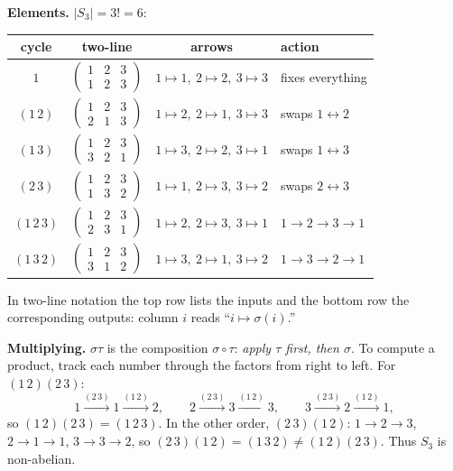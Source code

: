 \documentclass[11pt]{report}
\begin{document}
\begin{exbox}\label{ex:group-s3-detail}
\textbf{Elements.} $|S_3| = 3! = 6$:
\begin{center}
\renewcommand{\arraystretch}{1.15}
\begin{tabular}{c|c|c|l}
cycle & two-line & arrows & action \\ \hline
$1$ & $\begin{pmatrix}1&2&3\\1&2&3\end{pmatrix}$ & $1\mapsto1,\ 2\mapsto2,\ 3\mapsto3$ & fixes everything \\[10pt]
$(1\,2)$ & $\begin{pmatrix}1&2&3\\2&1&3\end{pmatrix}$ & $1\mapsto2,\ 2\mapsto1,\ 3\mapsto3$ & swaps $1 \leftrightarrow 2$ \\[10pt]
$(1\,3)$ & $\begin{pmatrix}1&2&3\\3&2&1\end{pmatrix}$ & $1\mapsto3,\ 2\mapsto2,\ 3\mapsto1$ & swaps $1 \leftrightarrow 3$ \\[10pt]
$(2\,3)$ & $\begin{pmatrix}1&2&3\\1&3&2\end{pmatrix}$ & $1\mapsto1,\ 2\mapsto3,\ 3\mapsto2$ & swaps $2 \leftrightarrow 3$ \\[10pt]
$(1\,2\,3)$ & $\begin{pmatrix}1&2&3\\2&3&1\end{pmatrix}$ & $1\mapsto2,\ 2\mapsto3,\ 3\mapsto1$ & $1 \to 2 \to 3 \to 1$ \\[10pt]
$(1\,3\,2)$ & $\begin{pmatrix}1&2&3\\3&1&2\end{pmatrix}$ & $1\mapsto3,\ 2\mapsto1,\ 3\mapsto2$ & $1 \to 3 \to 2 \to 1$
\end{tabular}
\end{center}
In two-line notation the top row lists the inputs and the bottom row the corresponding outputs: column $i$ reads ``$i \mapsto \sigma(i)$.''

\textbf{Multiplying.} $\sigma\tau$ is the composition $\sigma \circ \tau$: \emph{apply $\tau$ first, then $\sigma$}. To compute a product, track each number through the factors from right to left. For $(1\,2)(2\,3)$:
\[
1 \xrightarrow{(2\,3)} 1 \xrightarrow{(1\,2)} 2, \qquad
2 \xrightarrow{(2\,3)} 3 \xrightarrow{(1\,2)} 3, \qquad
3 \xrightarrow{(2\,3)} 2 \xrightarrow{(1\,2)} 1,
\]
so $(1\,2)(2\,3) = (1\,2\,3)$. In the other order, $(2\,3)(1\,2)$: $1 \to 2 \to 3$, $2 \to 1 \to 1$, $3 \to 3 \to 2$, so $(2\,3)(1\,2) = (1\,3\,2) \neq (1\,2)(2\,3)$. Thus $S_3$ is non-abelian.


\end{exbox}
\end{document}
